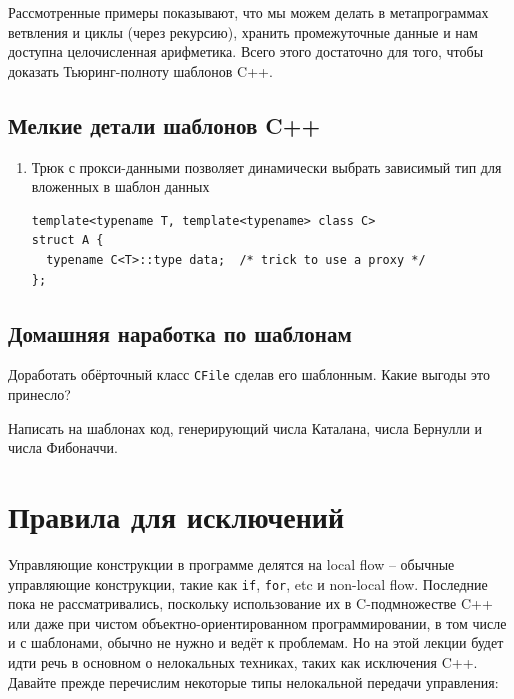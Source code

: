 \documentclass[a4paper,12pt,oneside]{article}
\begin{document}
Рассмотренные примеры показывают, что мы можем делать в метапрограммах ветвления и циклы (через рекурсию), хранить промежуточные данные и нам доступна целочисленная арифметика. Всего этого достаточно для того, чтобы доказать Тьюринг-полноту шаблонов C++.

\subsection{Мелкие детали шаблонов C++}

\begin{enumerate}
\item
Трюк с прокси-данными позволяет динамически выбрать зависимый тип для вложенных в шаблон данных

\begin{lstlisting}
template<typename T, template<typename> class C>
struct A {
  typename C<T>::type data;  /* trick to use a proxy */
};
\end{lstlisting}
\end{enumerate}

\subsection{Домашняя наработка по шаблонам}

Доработать обёрточный класс \lstinline!CFile! сделав его шаблонным. Какие выгоды это принесло? 

Написать на шаблонах код, генерирующий числа Каталана, числа Бернулли и числа Фибоначчи. 

\pagebreak
\section{Правила для исключений}

Управляющие конструкции в программе делятся на local flow -- обычные управляющие конструкции, такие как \lstinline!if!, \lstinline!for!, etc и non-local flow. Последние пока не рассматривались, поскольку использование их в C-подмножестве C++ или даже при чистом объектно-ориентированном программировании, в том числе и с шаблонами, обычно не нужно и ведёт к проблемам. Но на этой лекции будет идти речь в основном о нелокальных техниках, таких как исключения C++. Давайте прежде перечислим некоторые типы нелокальной передачи управления:
\end{document}
